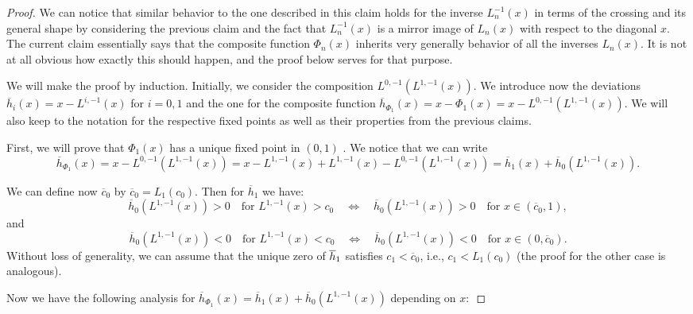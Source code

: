 \documentclass[10pt,a4paper]{amsart}
\begin{document}
\begin{proof}
We can notice that similar behavior to the one described in this claim holds
for the inverse $L_{n}^{-1}(x)$ in terms of the crossing and its general
shape by considering the previous claim and the fact that $L_{n}^{-1}(x)$ is
a mirror image of $L_{n}(x)$ with respect to the diagonal $x$. The current
claim essentially says that the composite function $\Phi _{n}(x)$ inherits
very generally behavior of all the inverses $L_{n}(x)$. It is not at all
obvious how exactly this should happen, and the proof below serves for that
purpose.

We will make the proof by induction. Initially, we consider the composition $%
L^{0,-1}(L^{1,-1}(x))$. We introduce now the deviations $\overline{h}%
_{i}(x)=x-L^{i,-1}(x)$ for $i=0,1$ and the one for the composite function $%
\overline{h}_{\Phi _{1}}(x)=x-\Phi _{1}(x)=x-L^{0,-1}(L^{1,-1}(x)).$ We will
also keep to the notation for the respective fixed points as well as their
properties from the previous claims.

First, we will prove that $\Phi _{1}(x)$ has a unique fixed point in $(0,1)$%
. We notice that we can write%
\begin{equation}
\overline{h}_{\Phi
_{1}}(x)=x-L^{0,-1}(L^{1,-1}(x))=x-L^{1,-1}(x)+L^{1,-1}(x)-L^{0,-1}(L^{1,-1}(x))=%
\overline{h}_{1}(x)+\overline{h}_{0}(L^{1,-1}(x)).  \label{173}
\end{equation}

We can define now $\overline{c}_{0}$ by $\overline{c}_{0}=L_{1}(c_{0})$.
Then for $\overline{h}_{1}$ we have: 
\begin{equation}
\overline{h}_{0}(L^{1,-1}(x))>0\quad \text{for }L^{1,-1}(x)>c_{0}\quad
\Longleftrightarrow \quad \overline{h}_{0}(L^{1,-1}(x))>0\quad \text{for }%
x\in (\overline{c}_{0},1),  \label{174}
\end{equation}%
and 
\begin{equation}
\overline{h}_{0}(L^{1,-1}(x))<0\quad \text{for }L^{1,-1}(x)<c_{0}\quad
\Longleftrightarrow \quad \overline{h}_{0}(L^{1,-1}(x))<0\quad \text{for }%
x\in (0,\overline{c}_{0}).  \label{175}
\end{equation}%
Without loss of generality, we can assume that the unique zero of $\overline{%
h}_{1}$ satisfies $c_{1}<\overline{c}_{0}$, i.e., $c_{1}<L_{1}(c_{0})$ (the
proof for the other case is analogous).

Now we have the following analysis for $\overline{h}_{\Phi _{1}}(x)=%
\overline{h}_{1}(x)+\overline{h}_{0}(L^{1,-1}(x))$ depending on $x:$


\end{proof}
\end{document}
